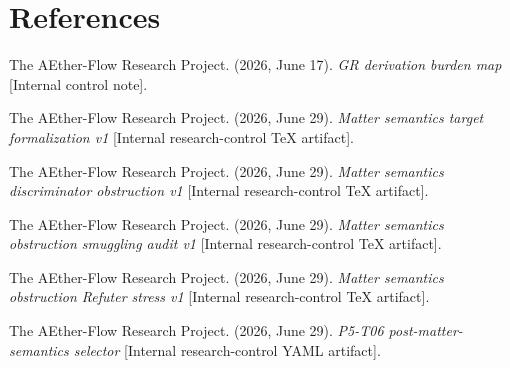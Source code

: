 \documentclass[11pt]{article}
\begin{document}
\section*{References}

The AEther-Flow Research Project. (2026, June 17). \emph{GR derivation burden
map} [Internal control note].

The AEther-Flow Research Project. (2026, June 29). \emph{Matter semantics
target formalization v1} [Internal research-control TeX artifact].

The AEther-Flow Research Project. (2026, June 29). \emph{Matter semantics
discriminator obstruction v1} [Internal research-control TeX artifact].

The AEther-Flow Research Project. (2026, June 29). \emph{Matter semantics
obstruction smuggling audit v1} [Internal research-control TeX artifact].

The AEther-Flow Research Project. (2026, June 29). \emph{Matter semantics
obstruction Refuter stress v1} [Internal research-control TeX artifact].

The AEther-Flow Research Project. (2026, June 29). \emph{P5-T06
post-matter-semantics selector} [Internal research-control YAML artifact].
\end{document}
